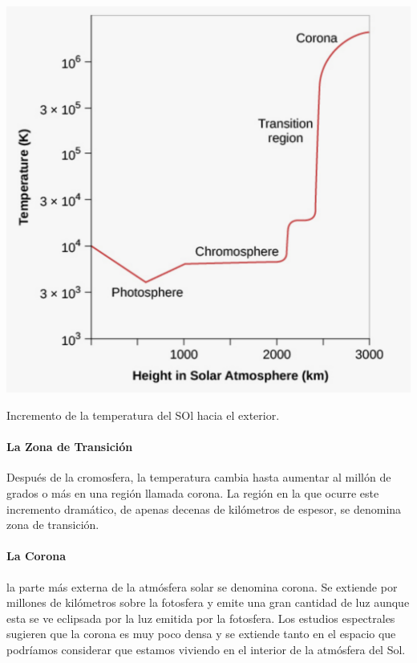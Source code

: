 \documentclass{tufte-handout}
\begin{document}
\begin{marginfigure}
  \includegraphics[width=\linewidth]{img/sun_t}
  \caption{Incremento de la temperatura del SOl hacia el exterior.}
\end{marginfigure}

\paragraph{La Zona de Transición}

Después de la cromosfera, la temperatura cambia hasta aumentar al millón de grados o más en una región llamada corona. La región en la que ocurre este incremento dramático, de apenas decenas de kilómetros de espesor, se denomina zona de transición.

\paragraph{La Corona}

la parte más externa de la atmósfera solar se denomina corona. Se extiende por millones de kilómetros sobre la fotosfera y emite una gran cantidad de luz aunque esta se ve eclipsada por la luz emitida por la fotosfera. Los estudios espectrales sugieren que la corona es muy poco densa y se extiende tanto en el espacio que podríamos considerar que estamos viviendo en el interior de la atmósfera del Sol.
\end{document}
